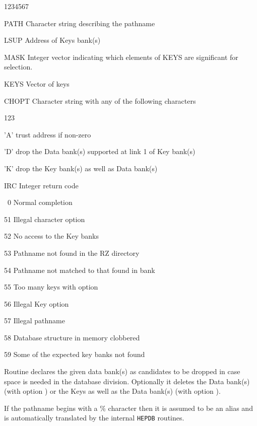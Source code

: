 \begin{DLtt}{1234567}
\item[PATH]Character string describing the pathname
\item[LSUP]Address of Keys bank(s) 
\item[MASK]Integer vector indicating which elements of KEYS are
significant for selection.
\item[KEYS]Vector of keys
\item[CHOPT]Character string with any of the following characters
  \begin{DLtt}{123}
    \item['A']trust  address if non-zero
    \item['D']drop the Data bank(s) supported at link 1 of Key bank(s)
    \item['K']drop the Key bank(s) as well as Data bank(s)
  \end{DLtt}
\item[IRC]Integer return code
  \begin{DLtt}{12}
    \item[\ 0]Normal completion
    \item[51]Illegal character option
    \item[52]No access to the Key banks
    \item[53]Pathname not found in the RZ directory
    \item[54]Pathname not matched to that found in bank 
    \item[55]Too many keys with option 
    \item[56]Illegal Key option
    \item[57]Illegal pathname
    \item[58]Database structure in memory clobbered
    \item[59]Some of the expected key banks not found
  \end{DLtt}
\end{DLtt}

Routine  declares the given data bank(s) as candidates to be
dropped in case space is needed in the database division. Optionally it
deletes the Data bank(s) (with option ) or the Keys as well as
the Data bank(s) (with option ).

If the pathname begins with a \% character then it is assumed to be
an alias and is automatically translated by the internal {\tt HEPDB}
routines.

